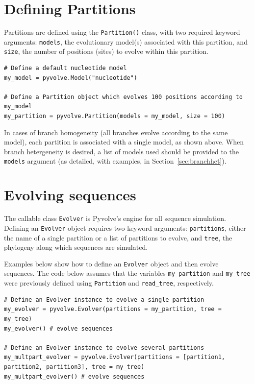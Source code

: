 \documentclass{article}
\newcommand{\code}[1]{\texttt{\small{#1}}}
\begin{document}
\section{Defining Partitions}\label{sec:partitions}

Partitions are defined using the \code{Partition()} class, with two required keyword arguments: \code{models}, the evolutionary model(s) associated with this partition, and \code{size}, the number of positions (sites) to evolve within this partition.
\begin{lstlisting}
# Define a default nucleotide model
my_model = pyvolve.Model("nucleotide")

# Define a Partition object which evolves 100 positions according to my_model
my_partition = pyvolve.Partition(models = my_model, size = 100)
\end{lstlisting}

In cases of branch homogeneity (all branches evolve according to the same model), each partition is associated with a single model, as shown above. When branch hetergeneity is desired, a list of models used should be provided to the \code{models} argument (as detailed, with examples, in Section~\ref{sec:branchhet}).



\section{Evolving sequences}\label{sec:evolver}

The callable class \code{Evolver} is Pyvolve's engine for all sequence simulation. Defining an \code{Evolver} object requires two keyword arguments: \code{partitions}, either the name of a single partition or a list of partitions to evolve, and \code{tree}, the phylogeny along which sequences are simulated.

Examples below show how to define an \code{Evolver} object and then evolve sequences. The code below assumes that the variables \code{my\_partition} and \code{my\_tree} were previously defined using \code{Partition} and \code{read\_tree}, respectively.
\begin{lstlisting}
# Define an Evolver instance to evolve a single partition
my_evolver = pyvolve.Evolver(partitions = my_partition, tree = my_tree)
my_evolver() # evolve sequences

# Define an Evolver instance to evolve several partitions
my_multpart_evolver = pyvolve.Evolver(partitions = [partition1, partition2, partition3], tree = my_tree)
my_multpart_evolver() # evolve sequences
\end{lstlisting}
\end{document}
